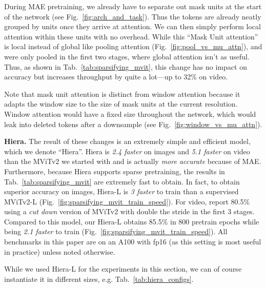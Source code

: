 \documentclass[nohyperref]{article}
\renewcommand{\paragraph}[1]{\vspace{1.25mm}\noindent\textbf{#1}}
\newcommand{\name}{{Hiera}}
\newcommand{\shortname}{{Hiera}}
\theoremstyle{plain}
\theoremstyle{definition}
\theoremstyle{remark}
\begin{document}
During MAE pretraining, we already have to separate out mask units at the start of the network (see Fig.~\ref{fig:arch_and_task}). Thus the tokens are already neatly grouped by units once they arrive at attention. We can then simply perform local attention within these units with no overhead. While this ``Mask Unit attention'' is local instead of global like pooling attention (Fig.~\ref{fig:pool_vs_mu_attn}),  and  were only pooled in the first two stages, where global attention isn't as useful. Thus, as shown in Tab.~\ref{tab:sparsifying_mvit}, this change has no impact on accuracy but increases throughput by quite a lot---up to 32\% on video.

Note that mask unit attention is distinct from window attention because it adapts the window size to the size of mask units at the current resolution. Window attention would have a fixed size throughout the network, which would leak into deleted tokens after a downsample (see Fig.~\ref{fig:window_vs_mu_attn}).

\paragraph{\name{}.}
The result of these changes is an extremely simple and efficient model, which we denote ``\name{}''. \shortname{} is \textit{2.4 faster} on images and \textit{5.1 faster} on video than the MViTv2 we started with and is actually \textit{more accurate} because of MAE. Furthermore, because \shortname{} supports sparse pretraining, the results in Tab.~\ref{tab:sparsifying_mvit} are extremely fast to obtain. In fact, to obtain superior accuracy on images, \shortname{-L} is \textit{3 faster} to train than a supervised MViTv2-L (Fig.~\ref{fig:sparsifying_mvit_train_speed}). For video, \citet{maskfeat} report 80.5\% using a \textit{cut down} version of MViTv2 with double the  stride in the first 3 stages. Compared to this model, our \shortname-L obtains 85.5\% in 800 pretrain epochs while being \textit{2.1 faster} to train (Fig.~\ref{fig:sparsifying_mvit_train_speed}).
All benchmarks in this paper are on an A100 with fp16 (as this setting is most useful in practice) unless noted otherwise.

While we used \shortname{-L} for the experiments in this section, we can of course instantiate it in different sizes, e.g. Tab.~\ref{tab:hiera_configs}.
\end{document}

